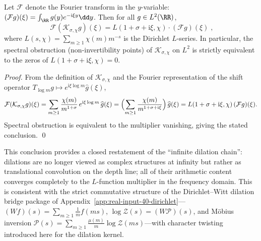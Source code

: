 \begin{theorem}\label{thm:phase-depth-spectrum-L}
Let \(\mathcal{F}\) denote the Fourier transform in the \(y\)-variable: \((\mathcal{F}g)(\xi)=\int_{\RR}g(y)e^{-\mathrm{i}\xi y}\dd y\).
Then for all \(g\in L^2(\RR)\),
\begin{equation}\label{eq:phase-depth-fourier-diagonalization}
\boxed{\;
\mathcal{F}(\mathcal{K}_{\sigma,\chi}g)(\xi)
=L(1+\sigma+\mathrm{i}\xi,\chi)\cdot(\mathcal{F}g)(\xi)\; },
\end{equation}
where \(L(s,\chi)=\sum_{m\ge 1}\chi(m)m^{-s}\) is the Dirichlet \(L\)-series.
In particular, the spectral obstruction (non-invertibility points) of \(\mathcal{K}_{\sigma,\chi}\) on \(L^2\) is strictly equivalent to the zeros of \(L(1+\sigma+\mathrm{i}\xi,\chi)=0\).
\end{theorem}
\begin{proof}
From the definition of \(\mathcal{K}_{\sigma,\chi}\) and the Fourier representation of the shift operator \(T_{\log m}g\mapsto e^{\mathrm{i}\xi\log m}\widehat g(\xi)\),
\[
\mathcal{F}(\mathcal{K}_{\sigma,\chi}g)(\xi)
=\sum_{m\ge 1}\frac{\chi(m)}{m^{1+\sigma}}\,e^{\mathrm{i}\xi\log m}\,\widehat g(\xi)
=\Bigl(\sum_{m\ge 1}\frac{\chi(m)}{m^{1+\sigma+\mathrm{i}\xi}}\Bigr)\,\widehat g(\xi)
=L(1+\sigma+\mathrm{i}\xi,\chi)\,(\mathcal{F}g)(\xi).
\]
Spectral obstruction is equivalent to the multiplier vanishing, giving the stated conclusion. \qed
\end{proof}
This conclusion provides a closed restatement of the ``infinite dilation chain'': dilations are no longer viewed as complex structures at infinity but rather as translational convolution on the depth line; all of their arithmetic content converges completely to the \(L\)-function multiplier in the frequency domain. This is consistent with the strict commutative structure of the Dirichlet--Witt dilation bridge package of Appendix~\ref{app:real-input-40-dirichlet}---\((Wf)(s)=\sum_{m\ge 1}\frac{1}{m}f(ms)\), \(\log\mathcal{Z}(s)=(W\mathcal{P})(s)\), and M\"obius inversion \(\mathcal{P}(s)=\sum_{m\ge 1}\frac{\mu(m)}{m}\log\mathcal{Z}(ms)\)---with character twisting introduced here for the dilation kernel.


